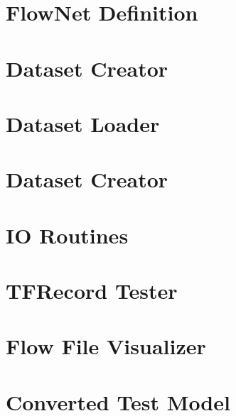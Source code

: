 \documentclass[]{article}
\begin{document}
\section{FlowNet Definition}

\newpage
\section{Dataset Creator}

\newpage
\section{Dataset Loader}

\newpage
\section{Dataset Creator}

\newpage
\section{IO Routines}

\newpage
\section{TFRecord Tester}

\newpage
\section{Flow File Visualizer}

\newpage
\section{Converted Test Model}

\end{document}
